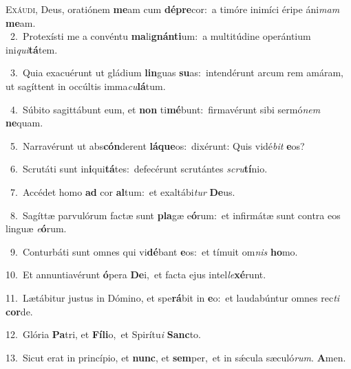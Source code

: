 \lettrine{\initial\textcolor{\initialcolor}{E}}{xáudi,} Deus, oratiónem \textbf{me}\-am cum \textbf{dé}\-\textbf{pre}cor:~\star a timóre inimíci éripe áni\textit{mam} \textbf{me}\-am.\\
{\numbfont\textcolor{\numbcolor}{~2.}}~Protexísti me a convéntu \textbf{ma}\-li\-\textbf{gnán}\-\textbf{ti}um:~\star a multitúdine operántium ini\-\textit{qui}\-\textbf{tá}tem.\par
{\numbfont\textcolor{\numbcolor}{~3.}}~Quia exacuérunt ut gládium \textbf{lin}\-guas \textbf{su}\-as:~\star intendérunt arcum rem amáram, ut sagíttent in occúltis imma\-\textit{cu}\-\textbf{lá}tum.\par
{\numbfont\textcolor{\numbcolor}{~4.}}~Súbito sagittábunt eum, et \textbf{non} ti\-\textbf{mé}\-bunt:~\star firmavérunt sibi sermó\textit{nem} \textbf{ne}\-quam.\par
{\numbfont\textcolor{\numbcolor}{~5.}}~Narravérunt ut abs\-\textbf{cón}\-derent \textbf{lá}\-\textbf{que}os:~\star dixérunt: Quis vidé\textit{bit} \textbf{e}\-os?\par
{\numbfont\textcolor{\numbcolor}{~6.}}~Scrutáti sunt in\-\textbf{i}\-qui\-\textbf{tá}\-tes:~\star defecérunt scrutántes \textit{scru}\-\textbf{tí}nio.\par
{\numbfont\textcolor{\numbcolor}{~7.}}~Accédet homo \textbf{ad} cor \textbf{al}\-tum:~\star et exaltábi\textit{tur} \textbf{De}\-us.\par
{\numbfont\textcolor{\numbcolor}{~8.}}~Sagíttæ parvulórum factæ sunt \textbf{pla}\-gæ e\-\textbf{ó}\-rum:~\star et infirmátæ sunt contra eos linguæ \textit{e}\-\textbf{ó}rum.\par
{\numbfont\textcolor{\numbcolor}{~9.}}~Conturbáti sunt omnes qui vi\-\textbf{dé}\-bant \textbf{e}\-os:~\star et tímuit om\textit{nis} \textbf{ho}\-mo.\par
{\numbfont\textcolor{\numbcolor}{10.}}~Et annuntiavérunt \textbf{ó}\-pera \textbf{De}\-i,~\star et facta ejus intel\-\textit{le}\-\textbf{xé}runt.\par
{\numbfont\textcolor{\numbcolor}{11.}}~Lætábitur justus in Dómino, et spe\-\textbf{rá}\-bit in \textbf{e}\-o:~\star et laudabúntur omnes rec\textit{ti} \textbf{cor}\-de.\par
{\numbfont\textcolor{\numbcolor}{12.}}~Glória \textbf{Pa}\-tri, et \textbf{Fí}\-\textbf{li}o,~\star et Spirítu\textit{i} \textbf{Sanc}\-to.\par
{\numbfont\textcolor{\numbcolor}{13.}}~Sicut erat in princípio, et \textbf{nunc}\-, et \textbf{sem}\-per,~\star et in sǽcula sæculó\-\textit{rum}\-. \textbf{A}\-men.\par

